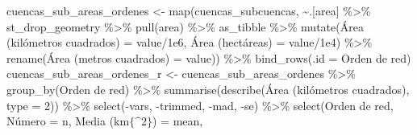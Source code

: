 \documentclass[spanish]{article}
\newenvironment{Shaded}{\begin{snugshade}}{\end{snugshade}}
\newcommand{\AttributeTok}[1]{\textcolor[rgb]{0.77,0.63,0.00}{#1}}
\newcommand{\DecValTok}[1]{\textcolor[rgb]{0.00,0.00,0.81}{#1}}
\newcommand{\FloatTok}[1]{\textcolor[rgb]{0.00,0.00,0.81}{#1}}
\newcommand{\FunctionTok}[1]{\textcolor[rgb]{0.00,0.00,0.00}{#1}}
\newcommand{\NormalTok}[1]{#1}
\newcommand{\OtherTok}[1]{\textcolor[rgb]{0.56,0.35,0.01}{#1}}
\newcommand{\SpecialCharTok}[1]{\textcolor[rgb]{0.00,0.00,0.00}{#1}}
\newcommand{\StringTok}[1]{\textcolor[rgb]{0.31,0.60,0.02}{#1}}
\begin{document}
\begin{Shaded}
\begin{Highlighting}[]
\NormalTok{cuencas\_sub\_areas\_ordenes }\OtherTok{\textless{}{-}} \FunctionTok{map}\NormalTok{(cuencas\_subcuencas,}
                         \SpecialCharTok{\textasciitilde{}}\NormalTok{.[}\StringTok{\textquotesingle{}area\textquotesingle{}}\NormalTok{] }\SpecialCharTok{\%\textgreater{}\%}\NormalTok{ st\_drop\_geometry }\SpecialCharTok{\%\textgreater{}\%}
                           \FunctionTok{pull}\NormalTok{(area) }\SpecialCharTok{\%\textgreater{}\%}\NormalTok{ as\_tibble }\SpecialCharTok{\%\textgreater{}\%}
                           \FunctionTok{mutate}\NormalTok{(}\StringTok{\textasciigrave{}}\AttributeTok{Área (kilómetros cuadrados)}\StringTok{\textasciigrave{}} \OtherTok{=}\NormalTok{ value}\SpecialCharTok{/}\FloatTok{1e6}\NormalTok{,}
                                  \StringTok{\textasciigrave{}}\AttributeTok{Área (hectáreas)}\StringTok{\textasciigrave{}} \OtherTok{=}\NormalTok{ value}\SpecialCharTok{/}\FloatTok{1e4}\NormalTok{) }\SpecialCharTok{\%\textgreater{}\%} 
                           \FunctionTok{rename}\NormalTok{(}\StringTok{\textasciigrave{}}\AttributeTok{Área (metros cuadrados)}\StringTok{\textasciigrave{}} \OtherTok{=}\NormalTok{ value)) }\SpecialCharTok{\%\textgreater{}\%} 
  \FunctionTok{bind\_rows}\NormalTok{(}\AttributeTok{.id =} \StringTok{\textquotesingle{}Orden de red\textquotesingle{}}\NormalTok{)}
\NormalTok{cuencas\_sub\_areas\_ordenes\_r }\OtherTok{\textless{}{-}}\NormalTok{ cuencas\_sub\_areas\_ordenes }\SpecialCharTok{\%\textgreater{}\%}
  \FunctionTok{group\_by}\NormalTok{(}\StringTok{\textasciigrave{}}\AttributeTok{Orden de red}\StringTok{\textasciigrave{}}\NormalTok{) }\SpecialCharTok{\%\textgreater{}\%} 
  \FunctionTok{summarise}\NormalTok{(}\FunctionTok{describe}\NormalTok{(}\StringTok{\textasciigrave{}}\AttributeTok{Área (kilómetros cuadrados)}\StringTok{\textasciigrave{}}\NormalTok{, }\AttributeTok{type =} \DecValTok{2}\NormalTok{)) }\SpecialCharTok{\%\textgreater{}\%} 
  \FunctionTok{select}\NormalTok{(}\SpecialCharTok{{-}}\StringTok{\textasciigrave{}}\AttributeTok{vars}\StringTok{\textasciigrave{}}\NormalTok{, }\SpecialCharTok{{-}}\NormalTok{trimmed, }\SpecialCharTok{{-}}\NormalTok{mad, }\SpecialCharTok{{-}}\NormalTok{se) }\SpecialCharTok{\%\textgreater{}\%}
  \FunctionTok{select}\NormalTok{(}\StringTok{\textasciigrave{}}\AttributeTok{Orden de red}\StringTok{\textasciigrave{}}\NormalTok{, }\StringTok{\textasciigrave{}}\AttributeTok{Número}\StringTok{\textasciigrave{}} \OtherTok{=}\NormalTok{ n, }\StringTok{\textasciigrave{}}\AttributeTok{Media (km$\{\^{}2\}$)}\StringTok{\textasciigrave{}} \OtherTok{=}\NormalTok{ mean,}

\end{Highlighting}
\end{Shaded}
\end{document}
